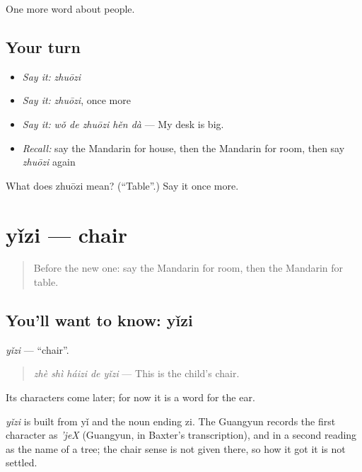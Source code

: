 \begin{grammarlens}[title={What you've built}]
One more word about people.
\end{grammarlens}

\subsection*{Your turn}
\begin{itemize}
\raggedright
  \item \emph{Say it:} \emph{zhuōzi}
  \item \emph{Say it:} \emph{zhuōzi}, once more
  \item \emph{Say it:} \emph{wǒ de zhuōzi hěn dà} — My desk is big.
  \item \emph{Recall:} say the Mandarin for house, then the Mandarin for room, then say \emph{zhuōzi} again
\end{itemize}

\begin{tcolorbox}[breakable,colback=teal!4,colframe=teal!35!black,title={Before you move on}]
What does zhuōzi mean? (\textquotedblleft{}Table\textquotedblright{}.) Say it once more.
\end{tcolorbox}
\section[yǐzi]{yǐzi — chair}

\label{lesson:ZH-C57-yizi}



\begin{quote}
Before the new one: say the Mandarin for room, then the Mandarin for table.
\end{quote}

\subsection*{You'll want to know: yǐzi}
\emph{yǐzi} — \textquotedblleft{}chair\textquotedblright{}.

\begin{quote}
\emph{zhè shì háizi de yǐzi} — This is the child's chair.
\end{quote}

Its characters come later; for now it is a word for the ear.

\begin{cousinweb}
\emph{yǐzi} is built from yǐ and the noun ending zi. The Guangyun records the first character as \emph{'jeX} (Guangyun, in Baxter's transcription), and in a second reading as the name of a tree; the chair sense is not given there, so how it got it is not settled.
\end{cousinweb}

